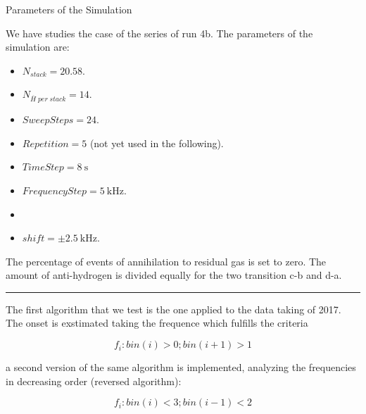 \documentclass[8pt]{beamer}
\begin{document}
\begin{frame}{Parameters of the Simulation}

We have studies the case of the series of run 4b. The parameters of the simulation are:
\begin{itemize}
\item $N_{stack} = 20.58$.
\item $N_{\overline{H} \; per \; stack} = 14$.
\item $SweepSteps = 24$.
\item $Repetition = 5$ (not yet used in the following).
\item $TimeStep = \SI{8}{\second}$
\item $FrequencyStep = \SI{5}{\kilo \hertz}$.
\item {}
\item $shift = \pm \SI{2.5}{\kilo \hertz}$.
\end{itemize}

The percentage of events of annihilation to residual gas is set to zero. The amount of anti-hydrogen is divided equally for the two transition c-b and d-a.
\vspace{2pt}
\hrule 
\vspace{2pt}
The first algorithm that we test is the one applied to the data taking of 2017. The onset is exstimated taking the frequence which fulfills the criteria

\begin{equation}
f_{i} : bin(i) > 0; bin(i + 1) > 1
\end{equation}

a second version of the same algorithm is implemented, analyzing the frequencies in decreasing order (reversed algorithm):

\begin{equation*}
f_{i} : bin(i) < 3; bin(i - 1) < 2
\end{equation*}

\end{frame}
\end{document}
